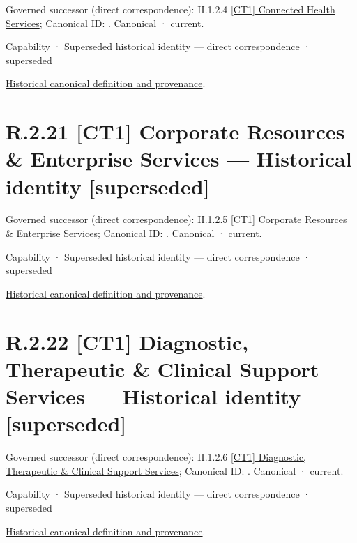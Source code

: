 {\small Governed successor (direct correspondence): II.1.2.4 \hyperref[element:3ef397463e584737b367e93f0bf1d85d]{[CT1] Connected Health Services}; Canonical ID: \texttt{}. Canonical · current.}\par
\label{element:48f01ef8b0e6431c85cf4f40cf8f94c3}
{\small Capability · Superseded historical identity — direct correspondence · superseded}\par
\href{../../../../continuum/strategy/capability/48f01ef8b0e6431c85cf4f40cf8f94c3.md}{Historical canonical definition and provenance}.\par
\section*{R.2.21 [CT1] Corporate Resources \& Enterprise Services — Historical identity [superseded]}
\label{navigation:R.2.21}

{\small Governed successor (direct correspondence): II.1.2.5 \hyperref[element:b79628f156e14a8cbb82a0dea2fc57ff]{[CT1] Corporate Resources \& Enterprise Services}; Canonical ID: \texttt{}. Canonical · current.}\par
\label{element:a2dbd74847a44f4c879983229f5c9d08}
{\small Capability · Superseded historical identity — direct correspondence · superseded}\par
\href{../../../../continuum/strategy/capability/a2dbd74847a44f4c879983229f5c9d08.md}{Historical canonical definition and provenance}.\par
\section*{R.2.22 [CT1] Diagnostic, Therapeutic \& Clinical Support Services — Historical identity [superseded]}
\label{navigation:R.2.22}

{\small Governed successor (direct correspondence): II.1.2.6 \hyperref[element:4d98c3503a9f4890a677f09b0c3b6f82]{[CT1] Diagnostic, Therapeutic \& Clinical Support Services}; Canonical ID: \texttt{}. Canonical · current.}\par
\label{element:e003b9cd0730459a84775d2837d1d173}
{\small Capability · Superseded historical identity — direct correspondence · superseded}\par
\href{../../../../continuum/strategy/capability/e003b9cd0730459a84775d2837d1d173.md}{Historical canonical definition and provenance}.\par
